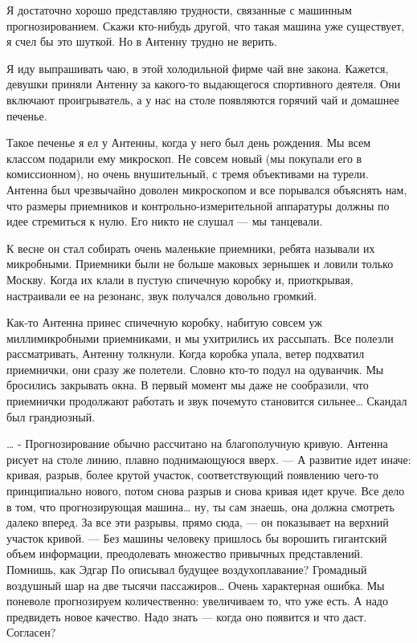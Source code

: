    Я  достаточно   хорошо  представляю   трудности,  связанные   с   машинным
   прогнозированием.  Скажи   кто-нибудь  другой,   что  такая   машина   уже
   существует, я счел бы это шуткой. Но в Антенну трудно не верить.

   Я иду выпрашивать чаю, в этой  холодильной фирме чай вне закона.  Кажется,
   девушки приняли Антенну за какого-то выдающегося спортивного деятеля.  Они
   включают проигрыватель, а у нас на столе появляются горячий чай и домашнее
   печенье.

   Такое печенье я  ел у Антенны,  когда у  него был день  рождения. Мы  всем
   классом подарили  ему  микроскоп.  Не  совсем новый  (мы  покупали  его  в
   комиссионном), но  очень  внушительный,  с тремя  объективами  на  турели.
   Антенна был чрезвычайно доволен микроскопом и все порывался объяснять нам,
   что размеры  приемников и  контрольно-измерительной аппаратуры  должны  по
   идее стремиться к нулю. Его никто не слушал — мы танцевали.

   К весне он  стал собирать  очень маленькие приемники,  ребята называли  их
   микробными. Приемники  были не  больше маковых  зернышек и  ловили  только
   Москву.  Когда  их  клали  в  пустую  спичечную  коробку  и,  приоткрывая,
   настраивали ее на резонанс, звук получался довольно громкий.

   Как-то Антенна принес спичечную коробку, набитую совсем уж миллимикробными
   приемниками, и  мы ухитрились  их  рассыпать. Все  полезли  рассматривать,
   Антенну толкнули.  Когда коробка  упала, ветер  подхватил приемнички,  они
   сразу  же  полетели.  Словно  кто-то  подул  на  одуванчик.  Мы  бросились
   закрывать окна.  В первый  момент мы  даже не  сообразили, что  приемнички
   продолжают работать  и  звук  почемуто  становится  сильнее…  Скандал  был
   грандиозный.

   … -  Прогнозирование обычно  рассчитано на  благополучную кривую.  Антенна
   рисует на  столе линию,  плавно  поднимающуюся вверх.  — А  развитие  идет
   иначе: кривая,  разрыв, более  крутой участок,  соответствующий  появлению
   чего-то принципиально  нового,  потом снова  разрыв  и снова  кривая  идет
   круче. Все дело в том, что  прогнозирующая машина… ну, ты сам знаешь,  она
   должна смотреть  далеко вперед.  За  все эти  разрывы,  прямо сюда,  —  он
   показывает на верхний участок  кривой. — Без  машины человеку пришлось  бы
   ворошить гигантский  объем  информации, преодолевать  множество  привычных
   представлений. Помнишь,  как Эдгар  По описывал  будущее  воздухоплавание?
   Громадный воздушный  шар  на  две  тысячи  пассажиров…  Очень  характерная
   ошибка. Мы поневоле  прогнозируем количественно: увеличиваем  то, что  уже
   есть. А надо предвидеть новое качество. Надо знать — когда оно появится  и
   что даст. Согласен?

